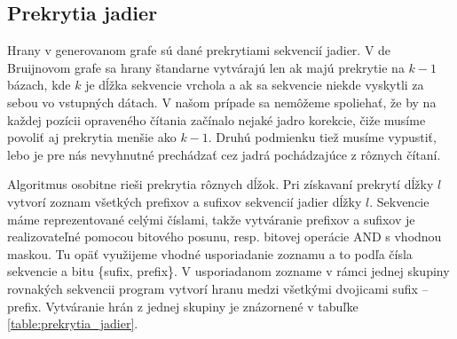 \subsection{Prekrytia jadier}

Hrany v generovanom grafe sú dané prekrytiami sekvencií jadier. V de Bruijnovom grafe sa hrany štandarne vytvárajú len ak majú prekrytie na $k - 1$ bázach, kde $k$ je dĺžka sekvencie vrchola a ak sa sekvencie niekde vyskytli za sebou vo vstupných dátach. V našom prípade sa nemôžeme spoliehať, že by na každej pozícii opraveného čítania začínalo nejaké jadro korekcie, čiže musíme povoliť aj prekrytia menšie ako $k - 1$. Druhú podmienku tiež musíme vypustiť, lebo je pre nás nevyhnutné prechádzať cez jadrá pochádzajúce z rôznych čítaní. 

Algoritmus osobitne rieši prekrytia rôznych dĺžok. Pri získavaní prekrytí dĺžky $l$ vytvorí zoznam všetkých prefixov a sufixov sekvencií jadier dĺžky $l$. Sekvencie máme reprezentované celými číslami, takže vytváranie prefixov a sufixov je realizovateľné pomocou bitového posunu, resp. bitovej operácie AND s vhodnou maskou. Tu opäť využijeme vhodné usporiadanie zoznamu a to podľa čísla sekvencie a bitu \{sufix, prefix\}. V usporiadanom zozname v rámci jednej skupiny rovnakých sekvencii program vytvorí hranu medzi všetkými dvojicami sufix -- prefix. Vytváranie hrán z jednej skupiny je znázornené v tabuľke \ref{table:prekrytia_jadier}.

